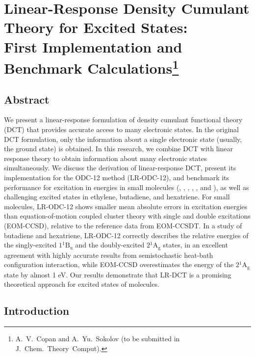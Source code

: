 \chapter[%
    Linear-Response Density Cumulant Theory for Excited States:\\
	First Implementation and Benchmark Calculations
]{%
    Linear-Response Density Cumulant Theory for Excited States:\\
	First Implementation and Benchmark Calculations\footnote{%
        A.~V.~Copan and A.~Yu.~Sokolov (to be submitted in
        J.~Chem.~Theory~Comput).
    }
}
\label{ch:response}


\section{Abstract}

We present a linear-response formulation of density cumulant functional theory
(DCT) that provides accurate access to many electronic states. 
In the original DCT formulation, only the information about a single electronic
state (usually, the ground state) is obtained.
In this research, we combine DCT with linear response theory to obtain
information about many electronic states simultaneously.
We discuss the derivation of linear-response DCT, present its implementation for
the ODC-12 method (LR-ODC-12), and benchmark its performance for excitation in
energies in small molecules (, , , , ,
and ), as well as challenging excited states in ethylene, butadiene,
and hexatriene. 
For small molecules, LR-ODC-12 shows smaller mean absolute errors in excitation
energies than equation-of-motion coupled cluster theory with single and double
excitations (EOM-CCSD), relative to the reference data from EOM-CCSDT\@.
In a study of butadiene and hexatriene, LR-ODC-12 correctly describes the
relative energies of the singly-excited $1{}^1\mathrm{B_{u}}$ and the
doubly-excited $2{}^1\mathrm{A_{g}}$ states, in an excellent agreement with
highly accurate results from semistochastic heat-bath configuration interaction,
while EOM-CCSD overestimates the energy of the $2{}^1\mathrm{A_{g}}$ state by
almost 1 eV.
Our results demonstrate that LR-DCT is a promising theoretical approach for
excited states of molecules. 


\section{Introduction}

